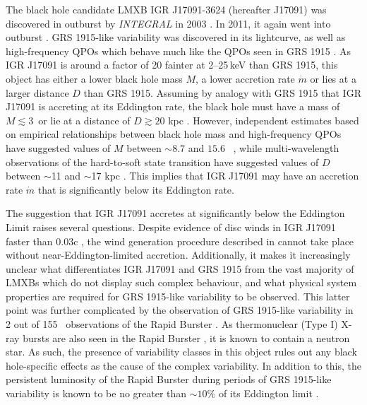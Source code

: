 \par The black hole candidate LMXB IGR J17091-3624 (hereafter J17091) was discovered in outburst by \textit{INTEGRAL} in 2003 \citep{Kuulkers_IGRDiscovery}.  In 2011, it again went into outburst \citep{Krimm_IGROutburst}.  GRS 1915-like variability was discovered in its lightcurve, as well as high-frequency QPOs which behave much like the QPOs seen in GRS 1915 \citep{Altamirano_IGR_FH,Altamirano_Discovery,Altamirano_HFQPO}.  As IGR J17091 is around a factor of 20 fainter at 2--25\,keV than GRS 1915, this object has either a lower black hole mass $M$, a lower accretion rate $\dot{m}$ or lies at a larger distance $D$ than GRS 1915.  Assuming by analogy with GRS 1915 that IGR J17091 is accreting at its Eddington rate, the black hole must have a mass of $M\lesssim3$\ms\ or lie at a distance of $D\gtrsim20$ kpc \citep{Altamirano_IGR_FH}.  However, independent estimates based on empirical relationships between black hole mass and high-frequency QPOs have suggested values of $M$ between $\sim8.7$ and $15.6$ \ms\ \citep{Rebusco_IGRMass,Iyer_Bayes,Iyer_IGRMass}, while multi-wavelength observations of the hard-to-soft state transition have suggested values of $D$ between $\sim$11 and $\sim$17 kpc \citep{Rodriguez_D}.  This implies that IGR J17091 may have an accretion rate $\dot{m}$ that is significantly below its Eddington rate.
\par The suggestion that IGR J17091 accretes at significantly below the Eddington Limit raises several questions.  Despite evidence of disc winds in IGR J17091 faster than 0.03c \citep{King_IGRWinds}, the wind generation procedure described in \citet{Neilsen_GRSModel} cannot take place without near-Eddington-limited accretion.   Additionally, it makes it increasingly unclear what differentiates IGR J17091 and GRS 1915 from the vast majority of LMXBs which do not display such complex behaviour, and what physical system properties are required for GRS 1915-like variability to be observed.  This latter point was further complicated by the observation of GRS 1915-like variability in 2 out of 155 \rxte\ observations of the Rapid Burster \citep{Bagnoli_RB}.  As thermonuclear (Type I) X-ray bursts are also seen in the Rapid Burster \citep{Hoffman_RB}, it is known to contain a neutron star.  As such, the presence of variability classes in this object rules out any black hole-specific effects as the cause of the complex variability.  In addition to this, the persistent luminosity of the Rapid Burster during periods of GRS 1915-like variability is known to be no greater than $\sim10\%$ of its Eddington limit \citep{Bagnoli_PopStudy}.

